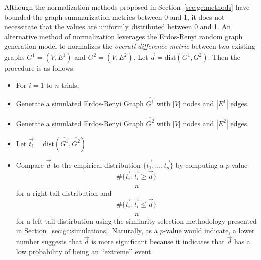 Although the normalization methods proposed in Section~\ref{sec:gc:methods} 
have bounded the graph summarization metrics between 0 and 1, it does not 
necessitate that the values are uniformly distributed between 0 and 1. An 
alternative method of normalization leverages the Erdos-Renyi random graph 
generation model to normalizes the \textit{overall difference metric} between 
two existing graphs $G^1=(V,E^1)$ and $G^2=(V,E^2)$. Let $\overrightarrow{d} = 
\text{dist}(G^1,G^2)$. Then the procedure is as follows:

\tablespacing
\begin{itemize}
	\item For $i = 1$ to $n$ trials,
	\item Generate a simulated Erdos-Renyi Graph $\hat{G^1}$ with $|V|$ nodes 
	and $|E^1|$ edges.
	\item Generate a simulated Erdos-Renyi Graph $\hat{G^2}$ with $|V|$ nodes 
	and $|E^2|$ edges.
	\item Let $\overrightarrow{t_i} = \text{dist}(\hat{G^1},\hat{G^2})$
	\item Compare $\overrightarrow{d}$ to the empirical distribution 
	$\{\overrightarrow{t_1},...,\overrightarrow{t_n}\}$ by computing a $p$-value
	$$\frac{\#\{\overrightarrow{t_i} : \overrightarrow{t_i} \geq 
	\overrightarrow{d} \}}{n}$$
	for a right-tail distribution and 
	$$\frac{\#\{\overrightarrow{t_i} : \overrightarrow{t_i} \leq 
	\overrightarrow{d} \}}{n}$$
	for a left-tail distirbution using the similarity selection methodology 
	presented in Section~\ref{sec:gc:simulations}. Naturally, as a $p$-value 
	would indicate, a lower number suggests that $\overrightarrow{d}$ is more 
	significant because it indicates that $\overrightarrow{d}$ has a low 
	probability of being an ``extreme'' event.
\end{itemize}
\bodyspacing
